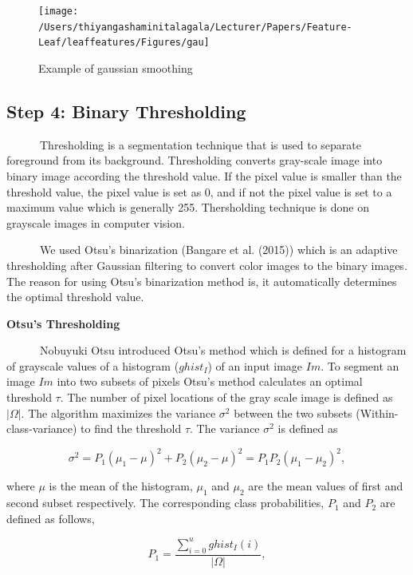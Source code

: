 \documentclass{article}
\begin{document}
\begin{figure}[!ht]

{\centering \texttt{[image: /Users/thiyangashaminitalagala/Lecturer/Papers/Feature-Leaf/leaffeatures/Figures/gau]} 

}

\caption{\label{fig:gau}Example of gaussian smoothing}\label{fig:unnamed-chunk-5}
\end{figure}

\hypertarget{step-4-binary-thresholding}{%
\subsection{Step 4: Binary
Thresholding}\label{step-4-binary-thresholding}}

~~~~~~Thresholding is a segmentation technique that is used to separate
foreground from its background. Thresholding converts gray-scale image
into binary image according the threshold value. If the pixel value is
smaller than the threshold value, the pixel value is set as 0, and if
not the pixel value is set to a maximum value which is generally 255.
Thersholding technique is done on grayscale images in computer vision.

~~~~~~We used Otsu's binarization (Bangare et al. (2015)) which is an
adaptive thresholding after Gaussian filtering to convert color images
to the binary images. The reason for using Otsu's binarization method
is, it automatically determines the optimal threshold value.

\textbf{Otsu's Thresholding}

~~~~~~Nobuyuki Otsu introduced Otsu's method which is defined for a
histogram of grayscale values of a histogram (\(ghist_I\)) of an input
image \(Im\). To segment an image \(Im\) into two subsets of pixels
Otsu's method calculates an optimal threshold \(\tau\). The number of
pixel locations of the gray scale image is defined as \(|\Omega|\). The
algorithm maximizes the variance \(\sigma^2\) between the two subsets
(Within-class-variance) to find the threshold \(\tau\). The variance
\(\sigma^2\) is defined as

\[\sigma^2 = P_1(\mu_1-\mu)^2 + P_2(\mu_2-\mu)^2 = P_1P_2(\mu_1-\mu_2)^2, \]

where \(\mu\) is the mean of the histogram, \(\mu_1\) and \(\mu_2\) are
the mean values of first and second subset respectively. The
corresponding class probabilities, \(P_1\) and \(P_2\) are defined as
follows,

\[P_1 = \frac{\sum_{i=0}^{u}ghist_I(i)}{|\Omega|},\]
\end{document}
